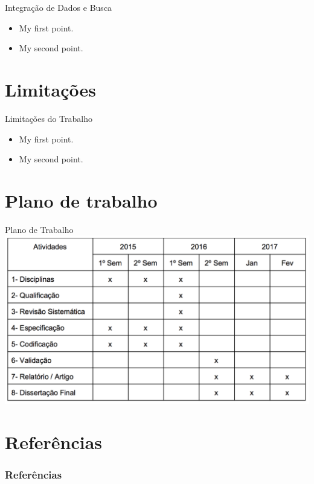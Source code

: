 \documentclass{beamer}
\begin{document}
\begin{frame}{Integração de Dados e Busca}
  \begin{itemize}
  \item {
    My first point.
  }
  \item {
    My second point.
  }
  \end{itemize}
\end{frame}

\section{Limitações}

\begin{frame}{Limitações do Trabalho}
  \begin{itemize}
  \item {
    My first point.
  }
  \item {
    My second point.
  }
  \end{itemize}
\end{frame}

\section{Plano de trabalho}

\begin{frame}{Plano de Trabalho}
    \includegraphics[scale=0.4]{plano_de_trabalho}
\end{frame}

\section*{Referências}

\begin{frame}[allowframebreaks]
    \frametitle{Referências}
    
    
\end{frame}
\end{document}
